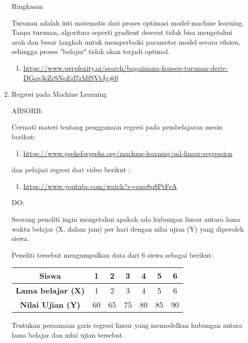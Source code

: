 \documentclass[a4paper]{article}
\begin{document}
\begin{enumerate}[itemsep=1em,leftmargin=*]
  Ringkasan

  Turunan adalah inti matematis dari proses optimasi model-machine learning. Tanpa turunan, algoritma seperti gradient descent tidak bisa mengetahui arah dan besar langkah untuk memperbaiki parameter model secara efisien, sehingga proses "belajar" tidak akan terjadi optimal.

  \begin{enumerate}
    \item \url{https://www.perplexity.ai/search/bagaimana-konsep-turunan-deriv-DGqg3sZrSNqEd7zMfSVtJg#0}
  \end{enumerate}

  \item Regresi pada Machine Learning
  
  ABSORB:

  Cermati materi tentang penggunaan regresi pada pembelajaran mesin berikut:

  \begin{enumerate}
    \item \url{https://www.geeksforgeeks.org/machine-learning/ml-linear-regression}
  \end{enumerate}

  dan pelajari regresi dari video berikut :

  \begin{enumerate}
    \item \url{https://www.youtube.com/watch?v=qxo8p8PtFeA}
  \end{enumerate}

  DO:

  Seorang peneliti ingin mengetahui apakah ada hubungan linear antara lama waktu belajar (X, dalam jam) per hari dengan nilai ujian (Y) yang diperoleh siswa.
  
  Peneliti tersebut mengumpulkan data dari 6 siswa sebagai berikut:

  \begin{table}[h!]
  \centering
  \begin{tabular}{|c|c|c|c|c|c|c|}
  \hline
  \textbf{Siswa} & 1 & 2 & 3 & 4 & 5 & 6 \\ \hline
  \textbf{Lama belajar (X)} & 1 & 2 & 3 & 4 & 5 & 6 \\ \hline
  \textbf{Nilai Ujian (Y)} & 60 & 65 & 75 & 80 & 85 & 90 \\ \hline
  \end{tabular}
  \end{table}

  Tentukan persamaan garis regresi linear yang memodelkan hubungan antara lama belajar dan nilai ujian tersebut.


\end{enumerate}
\end{document}
